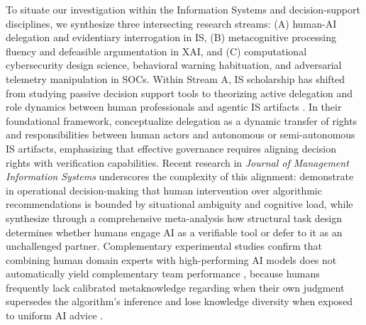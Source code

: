 \documentclass[11pt,a4paper]{article}
\begin{document}
To situate our investigation within the Information Systems and decision-support disciplines, we synthesize three intersecting research streams: (A) human-AI delegation and evidentiary interrogation in IS, (B) metacognitive processing fluency and defeasible argumentation in XAI, and (C) computational cybersecurity design science, behavioral warning habituation, and adversarial telemetry manipulation in SOCs. Within Stream A, IS scholarship has shifted from studying passive decision support tools to theorizing active delegation and role dynamics between human professionals and agentic IS artifacts \citep{baird2021next, raisch2021artificial, revilla2023human, ansari2026partner}. In their foundational framework, \citet{baird2021next} conceptualize delegation as a dynamic transfer of rights and responsibilities between human actors and autonomous or semi-autonomous IS artifacts, emphasizing that effective governance requires aligning decision rights with verification capabilities. Recent research in \textit{Journal of Management Information Systems} underscores the complexity of this alignment: \citet{revilla2023human} demonstrate in operational decision-making that human intervention over algorithmic recommendations is bounded by situational ambiguity and cognitive load, while \citet{ansari2026partner} synthesize through a comprehensive meta-analysis how structural task design determines whether humans engage AI as a verifiable tool or defer to it as an unchallenged partner. Complementary experimental studies confirm that combining human domain experts with high-performing AI models does not automatically yield complementary team performance \citep{fugener2021will, fugener2022cognitive, jussupow2021augmenting}, because humans frequently lack calibrated metaknowledge regarding when their own judgment supersedes the algorithm's inference \citep{fugener2022cognitive} and lose knowledge diversity when exposed to uniform AI advice \citep{fugener2021will}.
\end{document}
